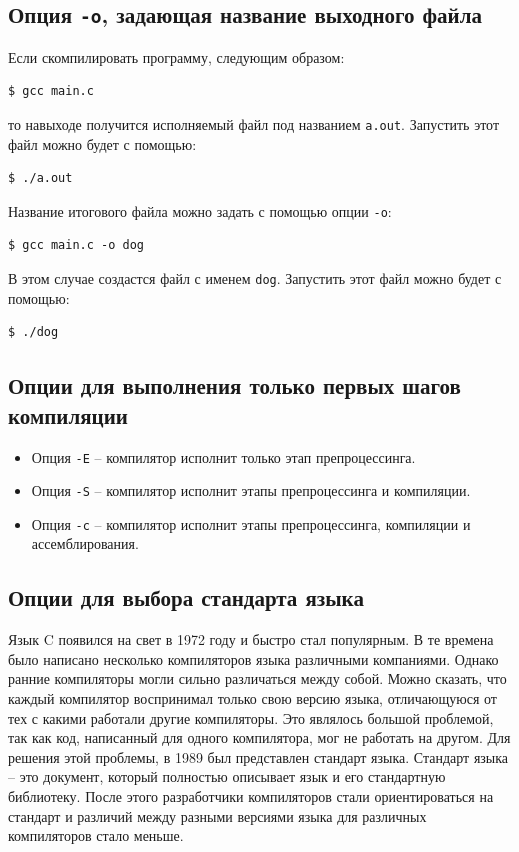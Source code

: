 \documentclass{article}
\begin{document}
\subsection*{Опция \texttt{-o}, задающая название выходного файла}
Если скомпилировать программу, следующим образом:
\begin{lstlisting}[style=csMiptBash]
$ gcc main.c
\end{lstlisting}
то навыходе получится исполняемый файл под названием \texttt{a.out}. Запустить этот файл можно будет с помощью:
\begin{lstlisting}[style=csMiptBash]
$ ./a.out
\end{lstlisting}
Название итогового файла можно задать с помощью опции \texttt{-o}:
\begin{lstlisting}[style=csMiptBash]
$ gcc main.c -o dog
\end{lstlisting}
В этом случае создастся файл с именем \texttt{dog}. Запустить этот файл можно будет с помощью: 
\begin{lstlisting}[style=csMiptBash]
$ ./dog
\end{lstlisting}

\subsection*{Опции для выполнения только первых шагов компиляции}
\begin{itemize}
\item Опция \texttt{-E} -- компилятор исполнит только этап препроцессинга.
\item Опция \texttt{-S} -- компилятор исполнит этапы препроцессинга и компиляции.
\item Опция \texttt{-c} -- компилятор исполнит этапы препроцессинга, компиляции и ассемблирования.
\end{itemize}


\subsection*{Опции для выбора стандарта языка}
Язык C появился на свет в 1972 году и быстро стал популярным. В те времена было написано несколько компиляторов языка различными компаниями. Однако ранние компиляторы могли сильно различаться между собой. Можно сказать, что каждый компилятор воспринимал только свою версию языка, отличающуюся от тех с какими работали другие компиляторы. Это являлось большой проблемой, так как код, написанный для одного компилятора, мог не работать на другом. Для решения этой проблемы, в 1989 был представлен стандарт языка. Стандарт языка -- это документ, который полностью описывает язык и его стандартную библиотеку. После этого разработчики компиляторов стали ориентироваться на стандарт и различий между разными версиями языка для различных компиляторов стало меньше.
\end{document}
